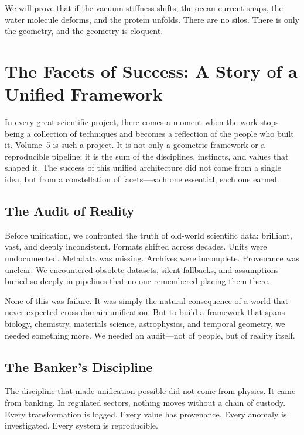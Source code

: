 \documentclass[11pt, letterpaper, openany]{book}
\begin{document}
We will prove that if the vacuum stiffness shifts, the ocean current snaps, the water molecule deforms, and the protein unfolds. There are no silos. There is only the geometry, and the geometry is eloquent.

\tableofcontents
\clearpage
\chapter{The Facets of Success: A Story of a Unified Framework}

In every great scientific project, there comes a moment when the work stops being a collection of
techniques and becomes a reflection of the people who built it. Volume~5 is such a project. It is not
only a geometric framework or a reproducible pipeline; it is the sum of the disciplines, instincts, and
values that shaped it. The success of this unified architecture did not come from a single idea, but
from a constellation of facets—each one essential, each one earned.

\section*{The Audit of Reality}
Before unification, we confronted the truth of old-world scientific data: brilliant, vast, and deeply
inconsistent. Formats shifted across decades. Units were undocumented. Metadata was missing.
Archives were incomplete. Provenance was unclear. We encountered obsolete datasets, silent
fallbacks, and assumptions buried so deeply in pipelines that no one remembered placing them
there.

None of this was failure. It was simply the natural consequence of a world that never expected
cross-domain unification. But to build a framework that spans biology, chemistry, materials science,
astrophysics, and temporal geometry, we needed something more. We needed an audit—not of
people, but of reality itself.

\section*{The Banker’s Discipline}
The discipline that made unification possible did not come from physics. It came from banking. In
regulated sectors, nothing moves without a chain of custody. Every transformation is logged. Every
value has provenance. Every anomaly is investigated. Every system is reproducible.
\end{document}
